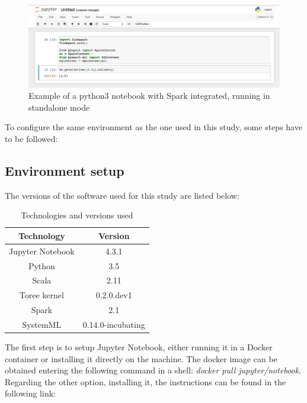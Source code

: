 \documentclass[11pt]{book} %
\begin{document}
    \begin{figure}[!ht]
      \centering
      \includegraphics[width=\textwidth]{spark_notebook_example.png}
      \caption{Example of a python3 notebook with Spark integrated, running in standalone mode}
      \label{notebook_spark_example}
    \end{figure}

    To configure the same environment as the one used in this study, some steps have to be followed:

    \subsection{Environment setup}

      The versions of the software used for this study are listed below:

    \begin{table}[!ht]
      \centering
      \begin{tabular}{| c | c |}
        \hline

        Technology & Version \\ \hline
        Jupyter Notebook & 4.3.1 \\ \hline
        Python & 3.5 \\ \hline
        Scala & 2.11 \\ \hline
        Toree kernel & 0.2.0.dev1 \\ \hline
        Spark & 2.1 \\ \hline
        SystemML & 0.14.0-incubating \\

        \hline
      \end{tabular}
      \caption{Technologies and versions used}
    \end{table}

    The first step is to setup Jupyter Notebook, either running it in a Docker container or installing it directly on the machine. The docker image can be obtained entering the following command in a shell: \emph{docker pull jupyter/notebook}. Regarding the other option, installing it, the instructions can be found in the following link:
\end{document}
